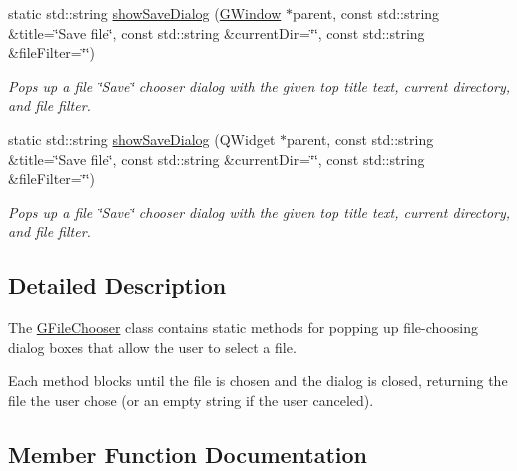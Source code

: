 \begin{DoxyCompactItemize}
static std\+::string \mbox{\hyperlink{classGFileChooser_ab1c47de23b7cb122ab4edc94ba672c47}{show\+Save\+Dialog}} (\mbox{\hyperlink{classGWindow}{G\+Window}} $\ast$parent, const std\+::string \&title=\char`\"{}Save file\char`\"{}, const std\+::string \&current\+Dir=\char`\"{}\char`\"{}, const std\+::string \&file\+Filter=\char`\"{}\char`\"{})
\begin{DoxyCompactList}\small\item\em Pops up a file \char`\"{}\+Save\char`\"{} chooser dialog with the given top title text, current directory, and file filter. \end{DoxyCompactList}\item 
static std\+::string \mbox{\hyperlink{classGFileChooser_a0207a9ef46bffc79e6cebaba47c2f493}{show\+Save\+Dialog}} (Q\+Widget $\ast$parent, const std\+::string \&title=\char`\"{}Save file\char`\"{}, const std\+::string \&current\+Dir=\char`\"{}\char`\"{}, const std\+::string \&file\+Filter=\char`\"{}\char`\"{})
\begin{DoxyCompactList}\small\item\em Pops up a file \char`\"{}\+Save\char`\"{} chooser dialog with the given top title text, current directory, and file filter. \end{DoxyCompactList}\end{DoxyCompactItemize}


\subsection{Detailed Description}
The \mbox{\hyperlink{classGFileChooser}{G\+File\+Chooser}} class contains static methods for popping up file-\/choosing dialog boxes that allow the user to select a file. 

Each method blocks until the file is chosen and the dialog is closed, returning the file the user chose (or an empty string if the user canceled). 

\subsection{Member Function Documentation}
\mbox{\label{classGFileChooser_abe21d73a151b976a4f639005b9652407}} 
